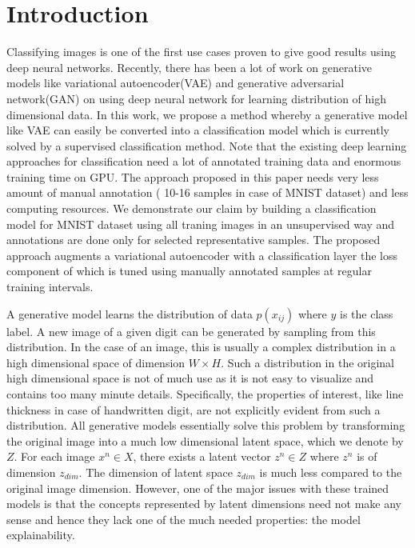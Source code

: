 \documentclass{uai2021} %
\begin{document}
\section{Introduction}\label{sec:intro}
Classifying images is one of the first use cases proven to give good results using deep neural networks.
Recently, there has been a lot of work on generative models like variational autoencoder(VAE)\cite{kingma2013auto} and generative adversarial network(GAN) \cite{goodfellow2014generative} on using deep neural network for learning distribution of high dimensional data.
In this work, we propose a method whereby a generative model like VAE can easily be converted into a classification model which is currently solved by a supervised classification method.
Note that the existing deep learning approaches for classification  need a lot of annotated training data and enormous training time on GPU\cite{krizhevsky2012imagenet}\cite{simonyan2014very}\cite{he2016deep}.
The approach proposed in this paper needs very less amount of manual annotation ( 10-16 samples in case of MNIST dataset)  and less computing resources.
We demonstrate our claim by building a classification model for MNIST dataset using all traning images in an unsupervised way and annotations are done only for selected representative samples.
The proposed approach augments a  variational autoencoder with a classification layer the loss component of which is tuned using manually annotated samples at regular training intervals.


A generative model learns the distribution of data $p(x_{ij})$ where $y$ is the class label.
A new image of a given digit can be generated by sampling from this distribution.
In the case of an image, this is usually a complex distribution in a high dimensional space of dimension $W \times H$.
Such a distribution in the original high dimensional space is not of much use as it is not easy to visualize and contains too many  minute details.
Specifically, the properties of interest, like line thickness in case of handwritten digit, are not explicitly evident from such a distribution.
All generative models essentially solve this problem by transforming the original image into a much low dimensional latent space, which we denote by  $Z$.
For each image $x^n \in X$, there exists a latent vector  $z^n \in Z$  where $z^n$ is of dimension $z_{dim}$.
The dimension of latent space $z_{dim}$ is much less compared to the original image dimension.
However, one of the major issues with these trained models is that the concepts represented by latent dimensions need not make any sense and hence they lack one of the much needed properties: the model explainability.
\end{document}
